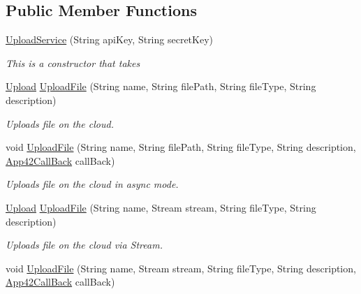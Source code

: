 \subsection*{Public Member Functions}
\begin{DoxyCompactItemize}
\item 
\hyperlink{classcom_1_1shephertz_1_1app42_1_1paas_1_1sdk_1_1csharp_1_1upload_1_1_upload_service_af1488abc384964cf9fa1d7dd2aff2f4e}{Upload\+Service} (String api\+Key, String secret\+Key)
\begin{DoxyCompactList}\small\item\em This is a constructor that takes \end{DoxyCompactList}\item 
\hyperlink{classcom_1_1shephertz_1_1app42_1_1paas_1_1sdk_1_1csharp_1_1upload_1_1_upload}{Upload} \hyperlink{classcom_1_1shephertz_1_1app42_1_1paas_1_1sdk_1_1csharp_1_1upload_1_1_upload_service_a181efe4b5b471fd2d69ffd3eacfac737}{Upload\+File} (String name, String file\+Path, String file\+Type, String description)
\begin{DoxyCompactList}\small\item\em Uploads file on the cloud. \end{DoxyCompactList}\item 
void \hyperlink{classcom_1_1shephertz_1_1app42_1_1paas_1_1sdk_1_1csharp_1_1upload_1_1_upload_service_a5d86655c3aa90f20ff47ac0b03b2296d}{Upload\+File} (String name, String file\+Path, String file\+Type, String description, \hyperlink{interfacecom_1_1shephertz_1_1app42_1_1paas_1_1sdk_1_1csharp_1_1_app42_call_back}{App42\+Call\+Back} call\+Back)
\begin{DoxyCompactList}\small\item\em Uploads file on the cloud in async mode. \end{DoxyCompactList}\item 
\hyperlink{classcom_1_1shephertz_1_1app42_1_1paas_1_1sdk_1_1csharp_1_1upload_1_1_upload}{Upload} \hyperlink{classcom_1_1shephertz_1_1app42_1_1paas_1_1sdk_1_1csharp_1_1upload_1_1_upload_service_a9e6327d9e1ce1f81110cdcafd680ee95}{Upload\+File} (String name, Stream stream, String file\+Type, String description)
\begin{DoxyCompactList}\small\item\em Uploads file on the cloud via Stream. \end{DoxyCompactList}\item 
void \hyperlink{classcom_1_1shephertz_1_1app42_1_1paas_1_1sdk_1_1csharp_1_1upload_1_1_upload_service_a2ba16ee1d498d956ca8ea49bbc62116a}{Upload\+File} (String name, Stream stream, String file\+Type, String description, \hyperlink{interfacecom_1_1shephertz_1_1app42_1_1paas_1_1sdk_1_1csharp_1_1_app42_call_back}{App42\+Call\+Back} call\+Back)

\end{DoxyCompactItemize}
